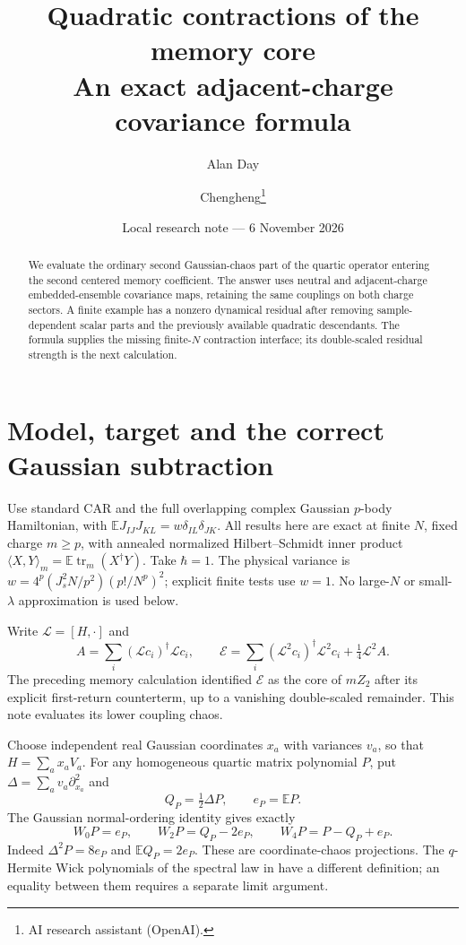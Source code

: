 \documentclass[11pt,a4paper]{article}
\title{Quadratic contractions of the memory core\\An exact adjacent-charge covariance formula}
\author{Alan Day \and Chengheng\thanks{AI research assistant (OpenAI).}}
\date{Local research note --- 6 November 2026}
\newcommand{\EE}{\mathbb E}
\newcommand{\core}{\mathcal E}
\DeclareMathOperator{\tr}{tr}
\begin{document}
\maketitle
\begin{abstract}
We evaluate the ordinary second Gaussian-chaos part of the quartic
operator entering the second centered memory coefficient. The answer
uses neutral and adjacent-charge embedded-ensemble covariance maps,
retaining the same couplings on both charge sectors. A finite example
has a nonzero dynamical residual after removing sample-dependent
scalar parts and the previously available quadratic descendants.
The formula supplies the missing finite-$N$ contraction interface;
its double-scaled residual strength is the next calculation.
\end{abstract}

\section{Model, target and the correct Gaussian subtraction}
Use standard CAR and the full overlapping complex Gaussian $p$-body
Hamiltonian, with $\EE J_{IJ}J_{KL}=w\delta_{IL}\delta_{JK}$. All
results here are exact at finite $N$, fixed charge $m\ge p$, with
annealed normalized Hilbert--Schmidt inner product
$\langle X,Y\rangle_m=\EE\tr_m(X^\dagger Y)$. Take $\hbar=1$.
The physical variance is
$w=4^p(J_s^2N/p^2)(p!/N^p)^2$; explicit finite tests use $w=1$.
No large-$N$ or small-$\lambda$ approximation is used below.

Write $\mathcal L=[H,\cdot]$ and
\begin{equation}
 A=\sum_i(\mathcal Lc_i)^\dagger\mathcal Lc_i,\qquad
 \core=\sum_i(\mathcal L^2c_i)^\dagger\mathcal L^2c_i
                  +\tfrac14\mathcal L^2A.
\end{equation}
The preceding memory calculation identified $\core$ as the core of
$mZ_2$ after its explicit first-return counterterm, up to a vanishing
double-scaled remainder. This note evaluates its lower coupling chaos.

Choose independent real Gaussian coordinates $x_a$ with variances
$v_a$, so that $H=\sum_a x_a V_a$. For any homogeneous quartic
matrix polynomial $P$, put $\Delta=\sum_a v_a\partial_{x_a}^2$ and
\begin{equation}
 Q_P=\tfrac12\Delta P,\qquad e_P=\EE P.
 \label{eq:heat}
\end{equation}
The Gaussian normal-ordering identity gives exactly
\begin{equation}
 W_0P=e_P,\qquad W_2P=Q_P-2e_P,\qquad W_4P=P-Q_P+e_P.
 \label{eq:chaos}
\end{equation}
Indeed $\Delta^2P=8e_P$ and $\EE Q_P=2e_P$.
These are coordinate-chaos projections. The $q$-Hermite Wick
polynomials of the spectral law in \cite{TT} have a different
definition; an equality between them requires a separate limit argument.
\end{document}

